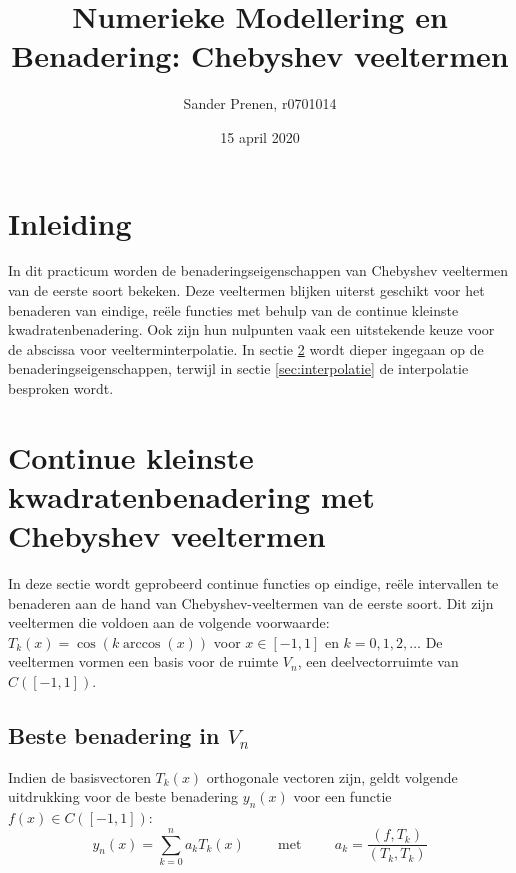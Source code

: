 \documentclass[a4paper, 12pt, titlepage, fleqn]{article}
\begin{document}
\title{\textbf{Numerieke Modellering en Benadering: Chebyshev veeltermen}}
\author{Sander Prenen, r0701014}

\date{15 april 2020}
\begin{titlepage}
	\maketitle
	\thispagestyle{empty}
\end{titlepage}

\newpage
\tableofcontents
\newpage
\section{Inleiding}
In dit practicum worden de benaderingseigenschappen van Chebyshev veeltermen van de eerste soort bekeken. Deze veeltermen blijken uiterst geschikt voor het benaderen van eindige, re\"ele functies met behulp van de continue kleinste kwadratenbenadering. Ook zijn hun nulpunten vaak een uitstekende keuze voor de abscissa voor veelterminterpolatie. In sectie \ref{sec:benadering} wordt dieper ingegaan op de benaderingseigenschappen, terwijl in sectie \ref{sec:interpolatie} de interpolatie besproken wordt.

\section{Continue kleinste kwadratenbenadering met Chebyshev veeltermen}
\label{sec:benadering}
In deze sectie wordt geprobeerd continue functies op eindige, re\"ele intervallen te benaderen aan de hand van Chebyshev-veeltermen van de eerste soort. Dit zijn veeltermen die voldoen aan de volgende voorwaarde: $T_k(x) = \cos(k \arccos (x))$ voor $x \in [-1,1]$ en $k = 0,1,2,\ldots$ De veeltermen vormen een basis voor de ruimte $V_n$, een deelvectorruimte van $C([-1,1])$. 


\subsection{Beste benadering in $V_n$}
Indien de basisvectoren $T_k(x)$ orthogonale vectoren zijn, geldt volgende uitdrukking voor de beste benadering $y_n(x)$ voor een functie $f(x) \in C([-1,1])$:
\begin{equation}
y_n(x) = \sum_{k=0}^na_kT_k(x) \hspace{1cm} \text{met} \hspace{1cm} a_k = \frac{(f,T_k)}{(T_k,T_k)}
\label{eq:beste_benadering}
\end{equation}
\end{document}

